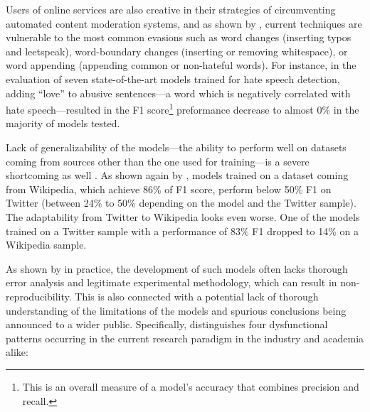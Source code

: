 \documentclass[preprint,12pt]{elsarticle}
\begin{document}
Users of online services are also creative in their strategies of circumventing automated content moderation systems, and as shown by \citet{grondahl2018all}, current techniques are vulnerable to the most common evasions such as word changes (inserting typos and leetspeak), word-boundary changes (inserting or removing whitespace), or word appending (appending common or non-hateful words). For instance, in the evaluation of seven state-of-the-art models trained for hate speech detection, adding “love” to abusive sentences---a word which is negatively correlated with hate speech---resulted in the F1 score\footnote{This is  an overall measure of a model’s accuracy that combines precision and recall.} preformance decrease to almost  0\% in the majority of models tested.

Lack of generalizability of the models---the ability to perform well on datasets coming from sources other than the one used for training---is a severe shortcoming as well \citep{rosa2019automatic, yin2021towards}. As shown again by \citet{grondahl2018all}, models trained on a dataset coming from Wikipedia, which achieve 86\% of F1 score, perform below 50\% F1 on Twitter (between 24\% to 50\% depending on the model and the Twitter sample). The adaptability from Twitter to Wikipedia looks even worse. One of the models trained on a Twitter sample with a performance of 83\% F1 dropped to 14\% on a Wikipedia sample.

As shown by \citet{wu2019errudite, lipton2019troubling, musgrave2020metric} in practice, the development of such models often lacks thorough error analysis and legitimate experimental methodology, which can result in non-reproducibility. This is also connected with a potential lack of thorough understanding of the limitations of the models and spurious conclusions being announced to a wider public. Specifically, \citet{lipton2019troubling} distinguishes four dysfunctional patterns occurring in the current research paradigm in the industry and academia alike: 
\end{document}
